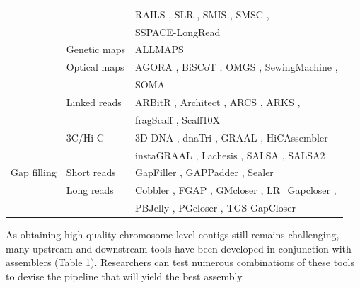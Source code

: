 \begin{table}
\begin{tabular}{|l|l|l|}
    &  & RAILS \cite{rails}, SLR \cite{slr}, SMIS \cite{smis}, SMSC \cite{smsc}, \\
    &  & SSPACE-LongRead \cite{sspace-longread} \\
    \cline{2-3}
    & Genetic maps & ALLMAPS \cite{allmaps} \\
    \cline{2-3}
    & Optical maps & AGORA \cite{agora}, BiSCoT \cite{biscot}, OMGS \cite{omgs}, SewingMachine \cite{sewingmachine}, \\
    &  & SOMA \cite{soma} \\
    \cline{2-3}
    & Linked reads & ARBitR \cite{arbitr}, Architect \cite{architect}, ARCS \cite{arcs}, ARKS \cite{arks}, \\ 
    &  & fragScaff \cite{fragscaff}, Scaff10X \cite{scaff10X} \\
    \cline{2-3}
    & 3C/Hi-C & 3D-DNA \cite{3d-dna}, dnaTri \cite{dnatri}, GRAAL \cite{graal}, HiCAssembler \cite{hicassembler} \\
    &  & instaGRAAL \cite{instagraal}, Lachesis \cite{lachesis}, SALSA \cite{salsa}, SALSA2 \cite{salsa2} \\
\hline
Gap filling & Short reads & GapFiller \cite{gapfiller}, GAPPadder \cite{gappadder}, Sealer \cite{sealer} \\
    \cline{2-3}
    & Long reads & Cobbler \cite{rails}, FGAP \cite{fgap}, GMcloser \cite{gmcloser}, LR\_Gapcloser \cite{lrgapcloser}, \\
    &  & PBJelly \cite{pbjelly}, PGcloser \cite{pgcloser}, TGS-GapCloser \cite{tgsgapcloser} \\
\hline
\end{tabular}
\label{tab:scaffolding}
\end{table}

As obtaining high-quality chromosome-level contigs still remains challenging, many upstream and downstream tools have been developed in conjunction with assemblers (Table \ref{tab:scaffolding}). Researchers can test numerous combinations of these tools to devise the pipeline that will yield the best assembly. \\

